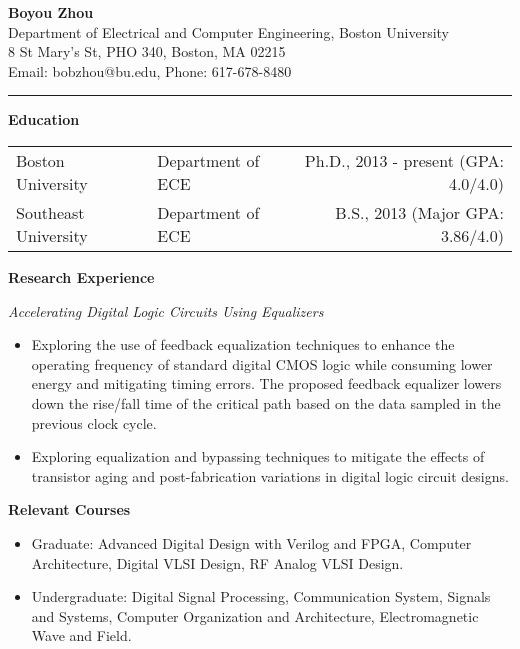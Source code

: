 \documentclass[]{article}
\begin{document}
\pagestyle{empty}
\begin{center}
{\large\textbf{Boyou Zhou}}\\
Department of Electrical and Computer Engineering, Boston University\\
8 St Mary's St, PHO 340, Boston, MA 02215\\
Email: bobzhou@bu.edu, Phone: 617-678-8480\\
\rule[-0.1cm]{7.5in}{0.01cm}
\end{center}
%

\textbf{Education}
\vspace{-0.1in}
\begin{table*}[h]
  \begin{tabular}{p{2.0in}p{2.0in}r}
	Boston University& Department of ECE & Ph.D., 2013 - present (GPA: 4.0/4.0)\\
	Southeast University & Department of ECE & B.S., 2013 (Major GPA: 3.86/4.0)\\ 
  \end{tabular}
  \label{tbl:1}
\end{table*}

\noindent \textbf{Research Experience}

\textit{Accelerating Digital Logic Circuits Using Equalizers}
		\begin{itemize}
			\item Exploring the use of feedback equalization techniques to enhance the operating frequency of standard digital CMOS logic while consuming lower energy and mitigating timing errors. The proposed feedback equalizer lowers down the rise/fall time of the critical path based on the data sampled in the previous clock cycle. 

			\item Exploring equalization and bypassing techniques to mitigate the effects of transistor aging and post-fabrication
            variations in digital logic circuit designs.
		\end{itemize}

\noindent \textbf{Relevant Courses}
\begin{itemize}
\item Graduate:
                	Advanced Digital Design with Verilog and FPGA, Computer Architecture, Digital VLSI Design,
                    RF Analog VLSI Design. 
\item Undergraduate:
                    Digital Signal Processing, Communication System, Signals and Systems, Computer Organization and 
                    Architecture, Electromagnetic Wave and Field. 
\end{itemize}
\end{document}
